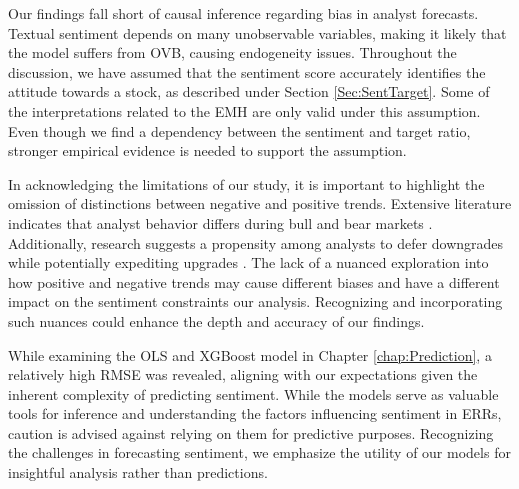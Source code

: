 




Our findings fall short of causal inference regarding bias in analyst forecasts. Textual sentiment depends on many unobservable variables, making it likely that the model suffers from OVB, causing endogeneity issues. Throughout the discussion, we have assumed that the sentiment score accurately identifies the attitude towards a stock, as described under Section \ref{Sec:SentTarget}. Some of the interpretations related to the EMH are only valid under this assumption. Even though we find a dependency between the sentiment and target ratio, stronger empirical evidence is needed to support the assumption. %

In acknowledging the limitations of our study, it is important to highlight the omission of distinctions between negative and positive trends. Extensive literature indicates that analyst behavior differs during bull and bear markets \parencite{hanna2020news, kim2007behavior}. Additionally, research suggests a propensity among analysts to defer downgrades while potentially expediting upgrades \parencite{ho2018modelling}. The lack of a nuanced exploration into how positive and negative trends may cause different biases and have a different impact on the sentiment constraints our analysis. Recognizing and incorporating such nuances could enhance the depth and accuracy of our findings.

While examining the OLS and XGBoost model in Chapter \ref{chap:Prediction}, a relatively high RMSE was revealed, aligning with our expectations given the inherent complexity of predicting sentiment. While the models serve as valuable tools for inference and understanding the factors influencing sentiment in ERRs, caution is advised against relying on them for predictive purposes. Recognizing the challenges in forecasting sentiment, we emphasize the utility of our models for insightful analysis rather than predictions.

